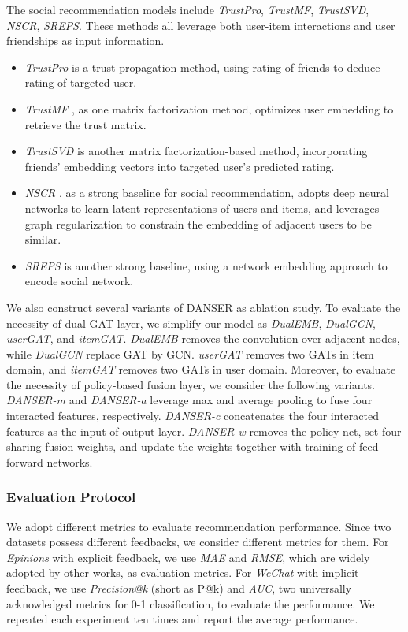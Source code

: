 \documentclass[sigconf]{acmart}
\begin{document}
The social recommendation models include \emph{TrustPro}, \emph{TrustMF}, \emph{TrustSVD}, \emph{NSCR}, \emph{SREPS}. These methods all leverage both user-item interactions and user friendships as input information.

\begin{itemize}
    \item \emph{TrustPro} \cite{geographical} is a trust propagation method, using rating of friends to deduce rating of targeted user.
    \item \emph{TrustMF} \cite{TrustMF}, as one matrix factorization method, optimizes user embedding to retrieve the trust matrix.
    \item \emph{TrustSVD} \cite{TrustSVD} is another matrix factorization-based method, incorporating friends' embedding vectors into targeted user's predicted rating.
    \item \emph{NSCR} \cite{NSCR}, as a strong baseline for social recommendation, adopts deep neural networks to learn latent representations of users and items, and leverages graph regularization to constrain the embedding of adjacent users to be similar.
    \item \emph{SREPS} \cite{SREPS} is another strong baseline, using a network embedding approach to encode social network.
\end{itemize}
 
We also construct several variants of DANSER as ablation study. To evaluate the necessity of dual GAT layer, we simplify our model as \emph{DualEMB}, \emph{DualGCN}, \emph{userGAT}, and \emph{itemGAT}. \emph{DualEMB} removes the convolution over adjacent nodes, while \emph{DualGCN} replace GAT by GCN. \emph{userGAT} removes two GATs in item domain, and \emph{itemGAT} removes two GATs in user domain. Moreover, to evaluate the necessity of policy-based fusion layer, we consider the following variants. \emph{DANSER-m} and \emph{DANSER-a} leverage max and average pooling to fuse four interacted features, respectively. \emph{DANSER-c} concatenates the four interacted features as the input of output layer. \emph{DANSER-w} removes the policy net, set four sharing fusion weights, and update the weights together with training of feed-forward networks.

\subsubsection{Evaluation Protocol}

We adopt different metrics to evaluate recommendation performance. Since two datasets possess different feedbacks, we consider different metrics for them. For \emph{Epinions} with explicit feedback, we use \emph{MAE} and \emph{RMSE}, which are widely adopted by other works, as evaluation metrics. For \emph{WeChat} with implicit feedback, we use \emph{Precision@k} (short as P@k) and \emph{AUC}, two universally acknowledged metrics for 0-1 classification, to evaluate the performance. We repeated each experiment ten times and report the
average performance.
\end{document}
